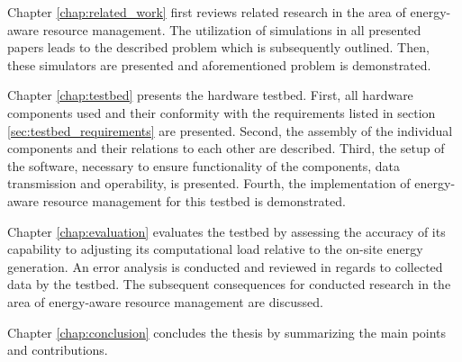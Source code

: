 Chapter \ref{chap:related_work} first reviews related research in the area of
energy-aware resource management. The utilization of simulations in all
presented papers leads to the described problem which is subsequently outlined.
Then, these simulators are presented and aforementioned problem is demonstrated.

Chapter \ref{chap:testbed} presents the hardware testbed. First, all hardware
components used and their conformity with the requirements listed in section
\ref{sec:testbed_requirements} are presented. Second, the assembly of the
individual components and their relations to each other are described. Third,
the setup of the software, necessary to ensure functionality of the components,
data transmission and operability, is presented. Fourth, the implementation of
energy-aware resource management for this testbed is demonstrated.

Chapter \ref{chap:evaluation} evaluates the testbed by assessing the accuracy of
its capability to adjusting its computational load relative to the on-site
energy generation. An error analysis is conducted and reviewed in regards to
collected data by the testbed. The subsequent consequences for conducted
research in the area of energy-aware resource management are discussed.

Chapter \ref{chap:conclusion} concludes the thesis by summarizing the main
points and contributions.
